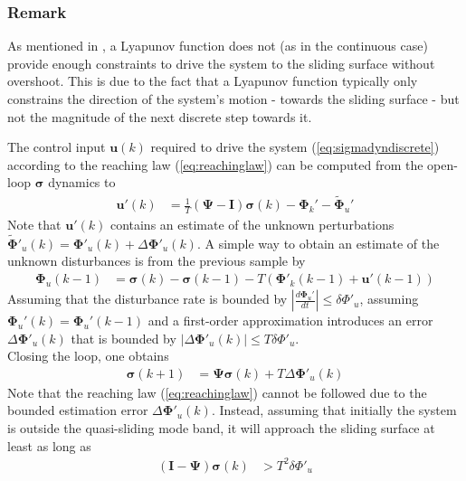 \documentclass{ifacconf}
\providecommand{\mbf}[1]{\mathbf{#1}}
\newcommand{\idxSample}{{\ensuremath{k}}}
\begin{document}
\subsubsection{Remark} As mentioned in \cite{monsees2001discrete}, a Lyapunov function does not (as in the continuous case) provide enough constraints to drive the system to the sliding surface without overshoot. This is due to the fact that a Lyapunov function typically only constrains the direction of the system's motion - towards the sliding surface - but not the magnitude of the next discrete step towards it. 

The control input $\mbf{u}(\idxSample)$ required to drive the system (\ref{eq:sigmadyndiscrete}) according to the reaching law (\ref{eq:reachinglaw}) can be computed from the open-loop $\mbf{\sigma}$ dynamics to
\begin{align}
\mbf{u}'(\idxSample) &= \frac{1}{T}(\mbf{\Psi} - \mbf{I})\mbf{\sigma}(\idxSample) - \mbf{\Phi}_k' - \tilde{\mbf{\Phi}}_u'
\end{align}
Note that $\mbf{u}'(\idxSample)$ contains an estimate of the unknown perturbations $\tilde{\mbf{\Phi}}'_u(\idxSample) = \mbf{\Phi}'_u(\idxSample) + \Delta \mbf{\Phi}'_u(\idxSample)$. 
A simple way to obtain an estimate of the unknown disturbances is from the previous sample by
\begin{align}
\mbf{\Phi}_u(\idxSample-1) &=
\mbf{\sigma}(\idxSample)
-
\mbf{\sigma}(\idxSample-1)
-
T
(\mbf{\Phi}'_k(\idxSample-1) + \mbf{u}'(\idxSample-1))
\end{align}
Assuming that the disturbance rate is bounded by $|\frac{d \mbf{\Phi}_u'}{dt}| \leq \delta \Phi'_u$, assuming $\mbf{\Phi}_u'(\idxSample) = \mbf{\Phi}_u'(\idxSample-1)$ and a first-order approximation introduces an error $\Delta \mbf{\Phi}'_u(\idxSample)$ that is bounded by $|\Delta \mbf{\Phi}'_u(\idxSample)| \leq T \delta \Phi'_u $.\\
Closing the loop, one obtains
\begin{align}
\mbf{\sigma}(\idxSample+1) &= \mbf{\Psi} \mbf{\sigma}(\idxSample) +
T \Delta \mbf{\Phi}'_u(\idxSample)
\end{align}
Note that the reaching law (\ref{eq:reachinglaw}) cannot be followed due to the bounded estimation error $\Delta \mbf{\Phi}'_u(\idxSample)$. Instead, assuming that initially the system is outside the quasi-sliding mode band, it will approach the sliding surface at least as long as
\begin{align}
(\mbf{I} - \mbf{\Psi}) \mbf{\sigma}(\idxSample) & > T^2 \delta \Phi'_u
\end{align}
\end{document}
